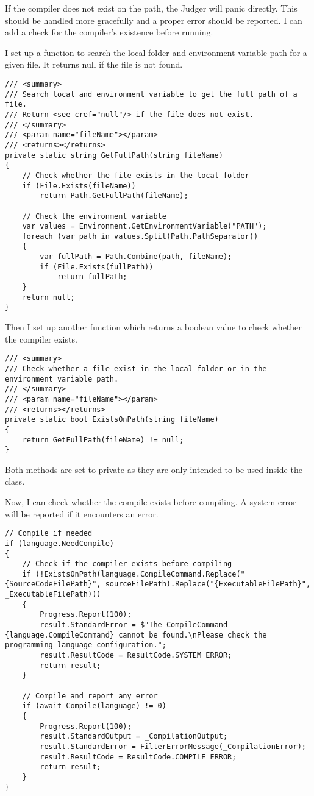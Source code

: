 \documentclass[report.tex]{subfiles}
\begin{document}
If the compiler does not exist on the path, the Judger will panic directly. This should be handled more gracefully and a proper error should be reported. I can add a check for the compiler's existence before running.

I set up a function  to search the local folder and environment variable path for a given file. It returns null if the file is not found.

\begin{verbatim}
/// <summary>
/// Search local and environment variable to get the full path of a file.
/// Return <see cref="null"/> if the file does not exist.
/// </summary>
/// <param name="fileName"></param>
/// <returns></returns>
private static string GetFullPath(string fileName)
{
    // Check whether the file exists in the local folder
    if (File.Exists(fileName))
        return Path.GetFullPath(fileName);

    // Check the environment variable
    var values = Environment.GetEnvironmentVariable("PATH");
    foreach (var path in values.Split(Path.PathSeparator))
    {
        var fullPath = Path.Combine(path, fileName);
        if (File.Exists(fullPath))
            return fullPath;
    }
    return null;
}
\end{verbatim}

Then I set up another function  which returns a boolean value to check whether the compiler exists.

\begin{verbatim}
/// <summary>
/// Check whether a file exist in the local folder or in the environment variable path.
/// </summary>
/// <param name="fileName"></param>
/// <returns></returns>
private static bool ExistsOnPath(string fileName)
{
    return GetFullPath(fileName) != null;
}
\end{verbatim}

Both methods are set to private as they are only intended to be used inside the  class.

Now, I can check whether the compile exists before compiling. A system error will be reported if it encounters an error.

\begin{verbatim}
// Compile if needed
if (language.NeedCompile)
{
    // Check if the compiler exists before compiling
    if (!ExistsOnPath(language.CompileCommand.Replace("{SourceCodeFilePath}", sourceFilePath).Replace("{ExecutableFilePath}", _ExecutableFilePath)))
    {
        Progress.Report(100);
        result.StandardError = $"The CompileCommand {language.CompileCommand} cannot be found.\nPlease check the programming language configuration.";
        result.ResultCode = ResultCode.SYSTEM_ERROR;
        return result;
    }

    // Compile and report any error
    if (await Compile(language) != 0)
    {
        Progress.Report(100);
        result.StandardOutput = _CompilationOutput;
        result.StandardError = FilterErrorMessage(_CompilationError);
        result.ResultCode = ResultCode.COMPILE_ERROR;
        return result;
    }
}
\end{verbatim}
\end{document}
